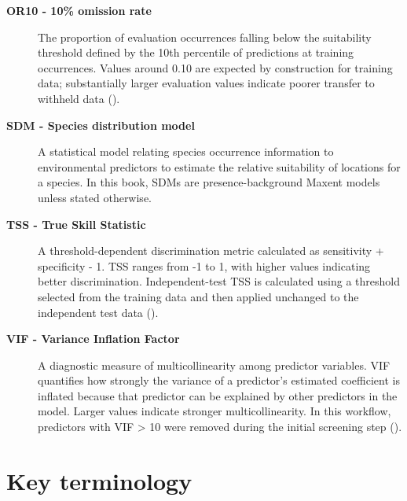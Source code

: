 \documentclass[
  openany]{book}
\begin{document}
\begin{description}
\item[\textbf{OR10 - 10\% omission rate}]
The proportion of evaluation occurrences falling below the suitability threshold defined by the 10th percentile of predictions at training occurrences. Values around 0.10 are expected by construction for training data; substantially larger evaluation values indicate poorer transfer to withheld data ().
\item[\textbf{SDM - Species distribution model}]
A statistical model relating species occurrence information to environmental
predictors to estimate the relative suitability of locations for a species. In
this book, SDMs are presence-background Maxent models unless stated otherwise.
\item[\textbf{TSS - True Skill Statistic}]
A threshold-dependent discrimination metric calculated as
sensitivity + specificity - 1. TSS ranges from -1 to 1, with higher values
indicating better discrimination. Independent-test TSS is calculated using a
threshold selected from the training data and then applied unchanged to the
independent test data ().
\item[\textbf{VIF - Variance Inflation Factor}]
A diagnostic measure of multicollinearity among predictor variables. VIF
quantifies how strongly the variance of a predictor's estimated coefficient is
inflated because that predictor can be explained by other predictors in the model.
Larger values indicate stronger multicollinearity. In this workflow, predictors
with VIF \textgreater{} 10 were removed during the initial screening step ().
\end{description}

\section*{Key terminology}\label{key-terminology}
\end{document}

